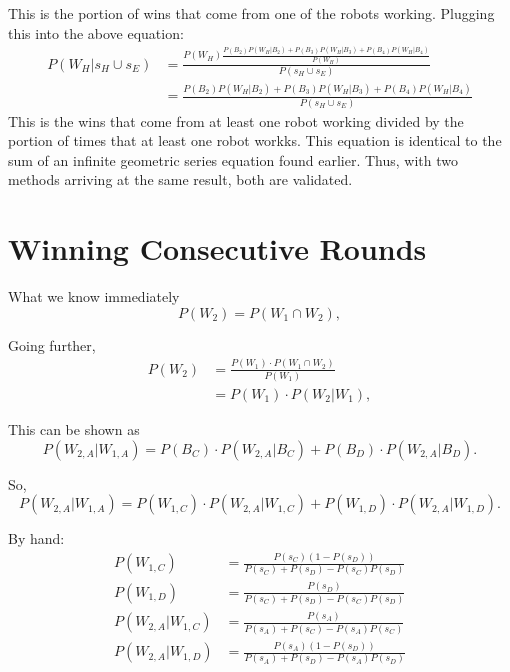 \documentclass[11pt]{article}
\begin{document}
This is the portion of wins that come from one of the robots working. Plugging this 
into the above equation:
\begin{align*}
    P(W_H | s_H \cup s_E) &= \frac{P(W_H) \frac{P(B_2) P(W_H | B_2) + P(B_3)P(W_H | B_3) + P(B_4)P(W_H | B_4)}{P(W_H)}}{P(s_H \cup s_E)}\\
    &= \frac{P(B_2) P(W_H | B_2) + P(B_3)P(W_H | B_3) + P(B_4)P(W_H | B_4)}{P(s_H \cup s_E)}
\end{align*}
This is the wins that come from at least one robot working divided by the portion of times that at least
one robot workks. This equation is identical to the sum of an infinite geometric series equation found earlier.
Thus, with two methods arriving at the same result, both are validated.

\section{Winning Consecutive Rounds}
What we know immediately
\begin{equation*}
    P(W_2) = P(W_1 \cap W_2),
\end{equation*}

Going further,
\begin{align*}
    P(W_2) &= \frac{P(W_1) \cdot P(W_1 \cap W_2)}{P(W_1)}\\
    &= P(W_1) \cdot P(W_2 | W_1),
\end{align*}

This can be shown as
\begin{equation*}
    P(W_{2,A} | W_{1,A}) = P(B_C) \cdot P(W_{2,A} | B_C) + P(B_D) \cdot P(W_{2,A} | B_D).
\end{equation*}

So,
\begin{equation*}
    P(W_{2,A} | W_{1,A}) = P(W_{1,C}) \cdot P(W_{2,A} | W_{1,C}) + P(W_{1,D}) \cdot P(W_{2,A} | W_{1,D}).
\end{equation*}

By hand:
\begin{align*}
    P(W_{1,C}) &= \frac{P(s_C)(1-P(s_D))}{P(s_C) + P(s_D) - P(s_C)P(s_D)}\\
    P(W_{1,D}) &= \frac{P(s_D)}{P(s_C) + P(s_D) - P(s_C)P(s_D)}\\
    P(W_{2,A} | W_{1,C}) &= \frac{P(s_A)}{P(s_A) + P(s_C) - P(s_A)P(s_C)}\\
    P(W_{2,A} | W_{1,D}) &= \frac{P(s_A)(1-P(s_D))}{P(s_A) + P(s_D) - P(s_A)P(s_D)}
\end{align*}
\end{document}
